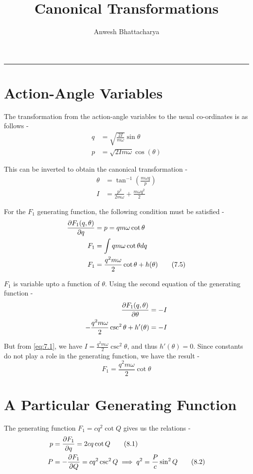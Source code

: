 \documentclass{article}
\begin{document}
\title{\textbf{Canonical Transformations}}
\author{Anwesh Bhattacharya}
\maketitle
\hrule


\section{Action-Angle Variables}

\justify
The transformation from the action-angle variables to the usual co-ordinates is as follows -
\begin{align*} 
q &= \sqrt{\frac{2I}{m\omega}}\sin{\theta} \tag{7.1}\label{eq:7.1}
 \\
p &= \sqrt{2Im\omega} \cos(\theta) \tag{7.2}\label{eq:7.2}
\end{align*}

\justify
This can be inverted to obtain the canonical transformation -
\begin{align*} 
\theta &= \tan^{-1}{\left(\frac{m\omega q}{p}\right)}  \tag{7.3}\label{eq:7.3}\\
I &= \frac{p^2}{2m\omega} + \frac{m\omega q^2}{2} \tag{7.4}\label{eq:7.4}
\end{align*}

\justify
For the $F_1$ generating function, the following condition must be satisfied -
\begin{align*} 
\pdv{F_1(q,\theta)}{q} &= p = qm\omega \cot{\theta} \\
F_1 &= \int qm\omega \cot{\theta} dq \\
F_1 &= \frac{q^2 m\omega}{2}\cot{\theta} + h(\theta) \tag{7.5}\label{eq:7.5}
\end{align*}

\justify
$F_1$ is variable upto a function of $\theta$. Using the second equation of the generating function -
\begin{align*} 
\pdv{F_1(q,\theta)}{\theta} &= -I \\
-\frac{q^2 m\omega}{2}\csc^2{\theta} + h'(\theta)&= -I
\end{align*}

\justify
But from \eqref{eq:7.1}, we have $\displaystyle{I = \frac{q^2 m\omega}{2}\csc^2{\theta}}$, and thus $h'(\theta) = 0$. Since constants do not play a role in the generating function, we have the result -
$$\displaystyle{
F_1 = \frac{q^2 m\omega}{2} \cot{\theta}
}$$

\section{A Particular Generating Function}
\justify
The generating function $\displaystyle{F_1 = cq^2\cot{Q}}$ gives us the relations -
\begin{align*} 
p &= \pdv{F_1}{q} = 2cq\cot{Q} \tag{8.1}\label{eq:8.1} \\
P &= -\pdv{F_1}{Q} = cq^2\csc^2{Q} \implies q^2 = \frac{P}{c}\sin^2{Q} \tag{8.2}\label{eq:8.2} 
\end{align*}
\end{document}

